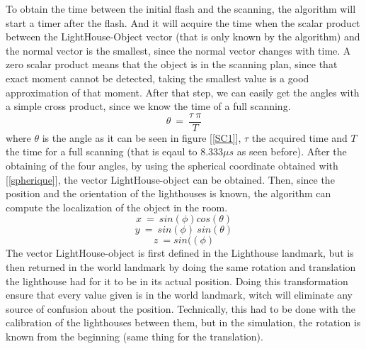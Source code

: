 \documentclass{vldb}
\begin{document}
To obtain the time between the initial flash and the scanning, the algorithm will start a timer after the flash. And it will acquire the time when the scalar product between the LightHouse-Object vector (that is only known by the algorithm) and the normal vector is the smallest, since the normal vector changes with time. A zero scalar product means that the object is in the scanning plan, since that exact moment cannot be detected, taking the smallest value is a good approximation of that moment. After that step, we can easily get the angles with a simple cross product, since we know the time of a full scanning.
\begin{equation}
\label{angle_calculus}
    \theta~=~\displaystyle\frac{\tau~\pi}{T}
\end{equation} where $\theta$ is the angle as it can be seen in figure [\ref{SC1}], $\tau$ the acquired time and $T$ the time for a full scanning (that is eqaul to $8.333 \mu s$ as seen before). After the obtaining of the four angles, by using the spherical coordinate obtained with [\ref{spherique}], the vector LightHouse-object can be obtained. Then, since the position and the orientation of the lighthouses is known, the algorithm can compute the localization of the object in the room.
    $$x~=~sin(\phi)cos(\theta)$$
\begin{equation}
\label{spherique}
    y~=~sin(\phi)~sin(\theta)
    \end{equation}
    $$z~=sin((\phi)$$
The vector LightHouse-object is first defined in the Lighthouse landmark, but is then returned in the world landmark by doing the same rotation and translation the lighthouse had for it to be in its actual position. Doing this transformation ensure that every value given is in the world landmark, witch will eliminate any source of confusion about the position. Technically, this had to be done with the calibration of the lighthouses between them, but in the simulation, the rotation is known from the beginning (same thing for the translation).
\end{document}
